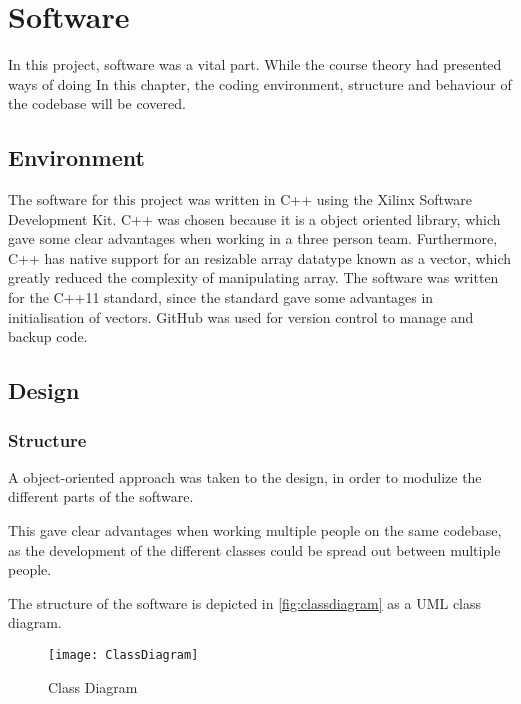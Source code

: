 \documentclass[Main]{subfiles}
\begin{document}
\section{Software} %
\label{sec:software}

	In this project, software was a vital part. 
	While the course theory had presented ways of doing 
	In this chapter, the coding environment, structure and behaviour of the codebase will be covered.
	
	\subsection{Environment} %
	\label{sub:software_environment}

		The software for this project was written in C++ using the Xilinx Software Development Kit.
		C++ was chosen because it is a object oriented library, which gave some clear advantages when working in a three person team.
		Furthermore, C++ has native support for an resizable array datatype known as a vector, which greatly reduced the complexity of manipulating array.
		The software was written for the C++11 standard, since the standard gave some advantages in initialisation of vectors.
		GitHub was used for version control	to manage and backup code.
		
		
	\subsection{Design} %
	\label{sub:software_design}

	\subsubsection{Structure} %
	\label{subsub:software_structure}
		A object-oriented approach was taken to the design, in order to modulize the different parts of the software. 
		
		This gave clear advantages when working multiple people on the same codebase, as the development of the different classes could be spread out between multiple people.
		
		The structure of the software is depicted in \autoref{fig:classdiagram} as a UML class diagram.
		
		\begin{figure}[H]
			\centering
			\texttt{[image: ClassDiagram]}
			\caption{Class Diagram}
			\label{fig:classdiagram}
		\end{figure}
		
\end{document}
